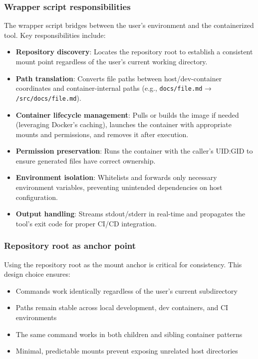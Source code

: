 \subsubsection{Wrapper script responsibilities}

The wrapper script bridges between the user's environment and the containerized
tool. Key responsibilities include:

\begin{itemize}
  \item \textbf{Repository discovery}: Locates the repository root to establish
    a consistent mount point regardless of the user's current working directory.

  \item \textbf{Path translation}: Converts file paths between host/dev-container
    coordinates and container-internal paths (e.g., \texttt{docs/file.md}
    → \texttt{/src/docs/file.md}).

  \item \textbf{Container lifecycle management}: Pulls or builds the image
    if needed (leveraging Docker's caching), launches the container
    with appropriate mounts and permissions, and removes it after execution.

  \item \textbf{Permission preservation}: Runs the container with the caller's
    UID:GID to ensure generated files have correct ownership.

  \item \textbf{Environment isolation}: Whitelists and forwards only necessary
    environment variables, preventing unintended dependencies on host
    configuration.

  \item \textbf{Output handling}: Streams stdout/stderr in real-time and
    propagates the tool's exit code for proper CI/CD integration.
\end{itemize}

\subsubsection{Repository root as anchor point}

Using the repository root as the mount anchor is critical for
consistency. This design choice ensures:

\begin{itemize}
  \item Commands work identically regardless of the user's current subdirectory

  \item Paths remain stable across local development, dev containers, and
    CI environments

  \item The same command works in both children and sibling container patterns

  \item Minimal, predictable mounts prevent exposing unrelated host
    directories
\end{itemize}

